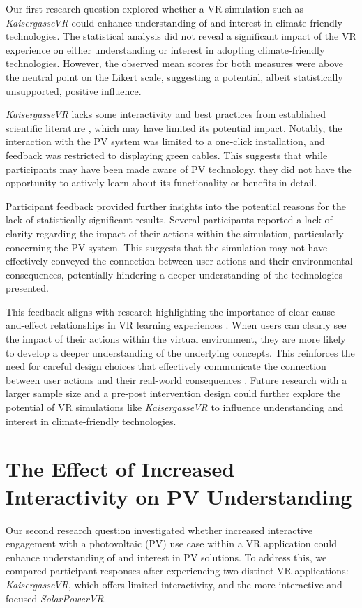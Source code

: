 \documentclass[draft, final]{vutinfth} %
\begin{document}
Our first research question explored whether a VR simulation such as \textit{KaisergasseVR} could enhance understanding of and interest in climate-friendly technologies. The statistical analysis did not reveal a significant impact of the VR experience on either understanding or interest in adopting climate-friendly technologies. However, the observed mean scores for both measures were above the neutral point on the Likert scale, suggesting a potential, albeit statistically unsupported, positive influence.

\textit{KaisergasseVR} lacks some interactivity and best practices from established scientific literature \cite{Dalgarno2010Learning, Gee2009Deep}, which may have limited its potential impact. Notably, the interaction with the PV system was limited to a one-click installation, and feedback was restricted to displaying green cables. This suggests that while participants may have been made aware of PV technology, they did not have the opportunity to actively learn about its functionality or benefits in detail. 

Participant feedback provided further insights into the potential reasons for the lack of statistically significant results. Several participants reported a lack of clarity regarding the impact of their actions within the simulation, particularly concerning the PV system. This suggests that the simulation may not have effectively conveyed the connection between user actions and their environmental consequences, potentially hindering a deeper understanding of the technologies presented.

This feedback aligns with research highlighting the importance of clear cause-and-effect relationships in VR learning experiences \cite{Bailenson2008Transformations, Merchant2014VrEffectiveness}. When users can clearly see the impact of their actions within the virtual environment, they are more likely to develop a deeper understanding of the underlying concepts. This reinforces the need for careful design choices that effectively communicate the connection between user actions and their real-world consequences \cite{Ding2022VrApplication}. Future research with a larger sample size and a pre-post intervention design could further explore the potential of VR simulations like \textit{KaisergasseVR} to influence understanding and interest in climate-friendly technologies.

\section{The Effect of Increased Interactivity on PV Understanding}
Our second research question investigated whether increased interactive engagement with a photovoltaic (PV) use case within a VR application could enhance understanding of and interest in PV solutions. To address this, we compared participant responses after experiencing two distinct VR applications: \textit{KaisergasseVR}, which offers limited interactivity, and the more interactive and focused \textit{SolarPowerVR}.
\end{document}

